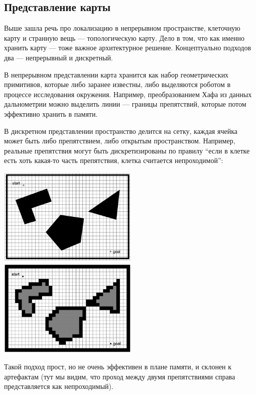\documentclass{../../text-style}
\begin{document}
\subsection{Представление карты}

Выше зашла речь про локализацию в непрерывном пространстве, клеточную карту и странную вещь --- топологическую карту.
Дело в том, что как именно хранить карту --- тоже важное архитектурное решение.
Концептуально подходов два --- непрерывный и дискретный.

В непрерывном представлении карта хранится как набор геометрических примитивов, которые либо заранее известны, либо выделяются роботом в процессе исследования окружения.
Например, преобразованием Хафа из данных дальнометрии можно выделить линии --- границы препятствий, которые потом эффективно хранить в памяти.

В дискретном представлении пространство делится на сетку, каждая ячейка может быть либо препятствием, либо открытым пространством.
Например, реальные препятствия могут быть дискретизированы по правилу \enquote{если в клетке есть хоть какая-то часть препятствия, клетка считается непроходимой}:

\begin{center}
    \includegraphics[width=0.5\textwidth]{fixedCellGrid.png}
\end{center}

Такой подход прост, но не очень эффективен в плане памяти, и склонен к артефактам (тут мы видим, что проход между двумя препятствиями справа представляется как непроходимый).
\end{document}
